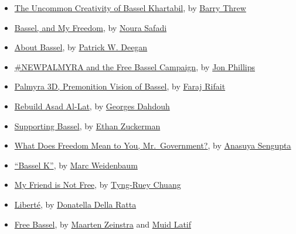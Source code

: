 \begin{itemize}
\tightlist
\item
  \href{the-uncommon-creativity-of-bassel-khartabil.html}{The Uncommon
  Creativity of Bassel Khartabil}, by
  \href{../appendix/attributions.html\#barry-threw}{Barry Threw}
\item
  \href{bassel-and-my-freedom.html}{Bassel, and My Freedom}, by
  \href{../appendix/attributions.html\#noura-ghazi-safadi}{Noura Safadi}
\item
  \href{about-bassel.html}{About Bassel}, by
  \href{../appendix/attributions.html\#patrick-w-deegan}{Patrick W.
  Deegan}
\item
  \href{newpalmyra-and-the-free-bassel-campaign.html}{\#NEWPALMYRA and
  the Free Bassel Campaign}, by
  \href{../appendix/attributions.html\#jon-phillips}{Jon Phillips}
\item
  \href{palmyra-3d-premonition-vision-of-bassel.html}{Palmyra 3D,
  Premonition Vision of Bassel}, by
  \href{../appendix/attributions.html\#faraj-rifait}{Faraj Rifait}
\item
  \href{rebuild-asad-al-lat.html}{Rebuild Asad Al-Lat}, by
  \href{../appendix/attributions.html\#georges-dahdouh}{Georges Dahdouh}
\item
  \href{supporting-bassel.html}{Supporting Bassel}, by
  \href{../appendix/attributions.html\#ethan-zuckerman}{Ethan Zuckerman}
\item
  \href{what-does-freedom-mean-to-you-mr-government.html}{What Does
  Freedom Mean to You, Mr.~Government?}, by
  \href{../appendix/attributions.html\#anasuya-sengupta}{Anasuya
  Sengupta}
\item
  \href{bassel-k.html}{``Bassel K''}, by
  \href{../appendix/attributions.html\#marc-weidenbaum}{Marc Weidenbaum}
\item
  \href{my-friend-is-not-free.html}{My Friend is Not Free}, by
  \href{../appendix/attributions.html\#tyng-ruey-chuang}{Tyng-Ruey
  Chuang}
\item
  \href{liberte.html}{Liberté}, by
  \href{../appendix/attributions.html\#donatella-della-ratta}{Donatella
  Della Ratta}
\item
  \href{free-bassel.html}{Free Bassel}, by
  \href{../appendix/attributions.html\#maarten-zeinstra}{Maarten
  Zeinstra} and \href{../appendix/attributions.html\#muid-latif}{Muid
  Latif}
\end{itemize}
